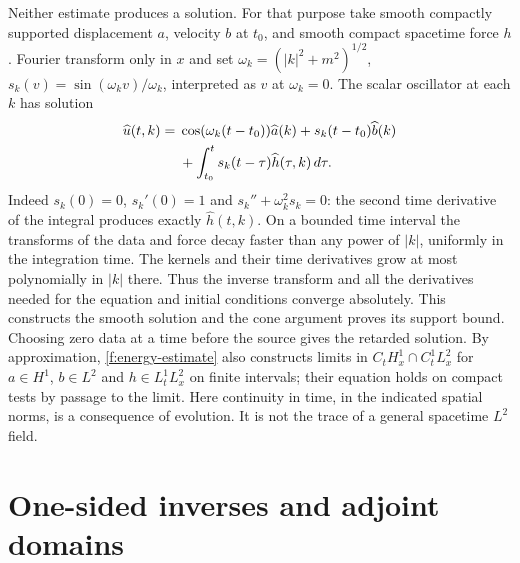 Neither estimate produces a solution. For that purpose take smooth compactly supported displacement $a$, velocity $b$ at $t_0$, and smooth compact spacetime force $h$. Fourier transform only in $x$ and set $\omega_k=(|k|^2+m^2)^{1/2}$, $s_k(v)=\sin(\omega_k v)/\omega_k$, interpreted as $v$ at $\omega_k=0$. The scalar oscillator at each $k$ has solution
\begin{align}
 \widehat u(t,k)={}&\cos(\omega_k(t-t_0))\widehat a(k)+s_k(t-t_0)\widehat b(k)\notag\\
 &+\int_{t_0}^t s_k(t-\tau)\widehat h(\tau,k)\,d\tau .\label{f:wave-existence}
\end{align}
Indeed $s_k(0)=0$, $s_k'(0)=1$ and $s_k''+\omega_k^2s_k=0$: the second time derivative of the integral produces exactly $\widehat h(t,k)$. On a bounded time interval the transforms of the data and force decay faster than any power of $|k|$, uniformly in the integration time. The kernels and their time derivatives grow at most polynomially in $|k|$ there. Thus the inverse transform and all the derivatives needed for the equation and initial conditions converge absolutely. This constructs the smooth solution and the cone argument proves its support bound. Choosing zero data at a time before the source gives the retarded solution. By approximation, \eqref{f:energy-estimate} also constructs limits in $C_t H^1_x\cap C^1_t L^2_x$ for $a\in H^1$, $b\in L^2$ and $h\in L^1_tL^2_x$ on finite intervals; their equation holds on compact tests by passage to the limit. Here continuity in time, in the indicated spatial norms, is a consequence of evolution. It is not the trace of a general spacetime $L^2$ field.

\section{One-sided inverses and adjoint domains}\label{f:green-domains}

